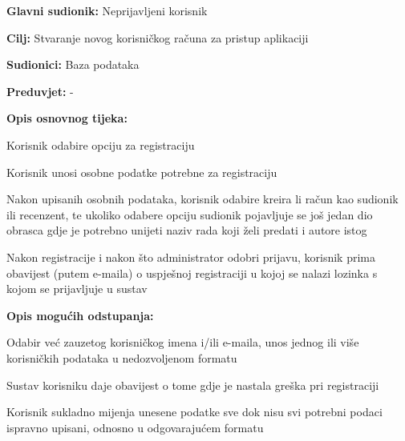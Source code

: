 					\noindent {}
					\begin{packed_item}
	
						\item \textbf{Glavni sudionik: } Neprijavljeni korisnik
						\item  \textbf{Cilj:} Stvaranje novog korisničkog računa za pristup aplikaciji
						\item  \textbf{Sudionici:} Baza podataka
						\item  \textbf{Preduvjet:} -
						\item  \textbf{Opis osnovnog tijeka:}
						
						\item[] \begin{packed_enum}
	
							\item Korisnik odabire opciju za registraciju
							\item Korisnik unosi osobne podatke potrebne za registraciju
							\item Nakon upisanih osobnih podataka, korisnik odabire kreira li račun kao sudionik ili recenzent, te ukoliko odabere opciju sudionik pojavljuje se još jedan dio obrasca gdje je potrebno unijeti naziv rada koji želi predati i autore istog
							\item Nakon registracije i nakon što administrator odobri prijavu, korisnik prima obavijest (putem e-maila) o uspješnoj registraciji u kojoj se nalazi lozinka s kojom se prijavljuje u sustav
						\end{packed_enum}

						\item  \textbf{Opis mogućih odstupanja:}
						
						\item[] \begin{packed_item}
	
							\item[2.a]  Odabir već zauzetog korisničkog imena i/ili e-maila, unos jednog ili više korisničkih podataka u nedozvoljenom formatu
							\item[] \begin{packed_enum}
								
								\item Sustav korisniku daje obavijest o tome gdje je nastala greška pri registraciji
								\item Korisnik sukladno mijenja unesene podatke sve dok nisu svi potrebni podaci ispravno upisani, odnosno u odgovarajućem formatu
								
							\end{packed_enum}
							
						\end{packed_item}
			
					\end{packed_item}
				
